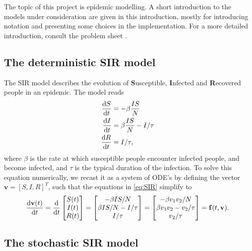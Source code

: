 The topic of this project is epidemic modelling. A short introduction to the models under consideration are given in this introduction, mostly for introducing notation and presenting some choices in the implementation. For a more detailed introduction, consult the problem sheet \cite{sheet}.

\subsection{The deterministic SIR model}
The SIR model describes the evolution of \textbf{S}usceptible, \textbf{I}nfected and \textbf{R}ecovered people in an epidemic. The model reads
\begin{subequations}\label{eq:SIR}
\begin{align}
	\frac{\text{d} S}{\text{d} t} &= - \beta \frac{I S}{N}\\
	\frac{\text{d} I}{\text{d} t} &= \beta \frac{IS }{N} - I/\tau \\
	\frac{\text{d} R}{\text{d} t} &= I/\tau, 
\end{align}
\end{subequations}
where $\beta$ is the rate at which susceptible people encounter infected people, and become infected, and $\tau$ is the typical duration of the infection. To solve this equation numerically, we recast it as a system of ODE's by defining the vector $\mathbf{v} = [S,I,R]^T$, such that the equations in \ref{eq:SIR} simplify to
\begin{equation}\label{eq:sir_vect}
	\frac{\text{d} \mathbf{v}(t)}{\text{d} t} = \frac{\mathrm{d}}{\mathrm{d}t} \begin{bmatrix}
		S(t) \\
		I(t) \\
		R(t)
	\end{bmatrix}
	= \begin{bmatrix}
		- \beta IS/N \\
		\beta  IS/N - I/\tau \\
		I/\tau
	\end{bmatrix} = \begin{bmatrix}
		-\beta v_1 v_2 /N \\
		\beta v_1 v_2 - v_2/\tau \\
		v_2 / \tau
	\end{bmatrix}= \mathbf{f}(t,\mathbf{v}).
\end{equation}

\subsection{The stochastic SIR model}\label{sec:stochsirtheory}

